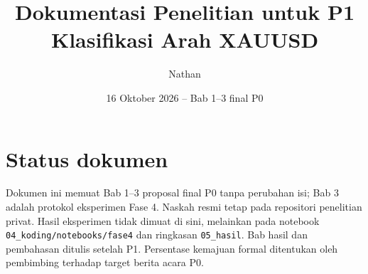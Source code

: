 \documentclass[12pt,a4paper]{report}
\title{Dokumentasi Penelitian untuk P1\\Klasifikasi Arah XAUUSD}
\author{Nathan}
\date{16 Oktober 2026 -- Bab 1--3 final P0}
\begin{document}
\renewcommand{\chaptername}{BAB}
\renewcommand{\contentsname}{DAFTAR ISI}
\maketitle
\chapter*{Status dokumen}
Dokumen ini memuat Bab 1--3 proposal final P0 tanpa perubahan isi; Bab 3 adalah protokol eksperimen Fase 4. Naskah resmi tetap pada repositori penelitian privat. Hasil eksperimen tidak dimuat di sini, melainkan pada notebook \texttt{04\_koding/notebooks/fase4} dan ringkasan \texttt{05\_hasil}. Bab hasil dan pembahasan ditulis setelah P1. Persentase kemajuan formal ditentukan oleh pembimbing terhadap target berita acara P0.
\tableofcontents



\printbibliography[heading=bibintoc,title={DAFTAR REFERENSI}]
\end{document}
